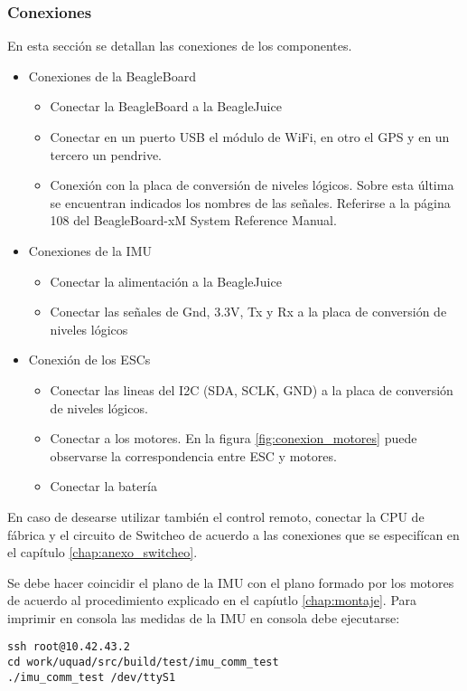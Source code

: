\documentclass[main]{subfiles}
\begin{document}
\subsubsection{Conexiones}
En esta secci\'on se detallan las conexiones de los componentes.
\begin{itemize}
\item Conexiones de la BeagleBoard
	\begin{itemize}
	\item Conectar la BeagleBoard a la BeagleJuice
	\item Conectar en un puerto USB el módulo de WiFi, en otro el GPS y en un tercero un pendrive.
	\item Conexión con la placa de conversión de niveles lógicos. Sobre esta \'ultima se encuentran indicados los nombres de las señales. Referirse a la p\'agina 108 del BeagleBoard-xM System Reference Manual.
	\end{itemize}
\item Conexiones de la IMU
	\begin{itemize}
	\item Conectar la alimentaci\'on a la BeagleJuice
	\item Conectar las señales de Gnd, 3.3V, Tx y Rx a la placa de conversión de niveles l\'ogicos
	\end{itemize}
\item Conexión de los ESCs
	\begin{itemize}
	\item Conectar las lineas del I2C (SDA, SCLK, GND) a la placa de conversión de niveles l\'ogicos.
	\item Conectar a los motores. En la figura \ref{fig:conexion_motores} puede observarse la correspondencia entre ESC y motores.
	\item Conectar la bater\'ia
	\end{itemize}
\end{itemize}

En caso de desearse utilizar también el control remoto, conectar la CPU de f\'abrica y el circuito de Switcheo de acuerdo a las conexiones que se especif\'ican en el cap\'itulo \ref{chap:anexo_switcheo}.

Se debe hacer coincidir el plano de la IMU con el plano formado por los motores de acuerdo al procedimiento explicado en el cap\'iutlo \ref{chap:montaje}. Para imprimir en consola las medidas de la IMU en consola debe ejecutarse:
\begin{verbatim}
ssh root@10.42.43.2
cd work/uquad/src/build/test/imu_comm_test
./imu_comm_test /dev/ttyS1
\end{verbatim}
\end{document}
